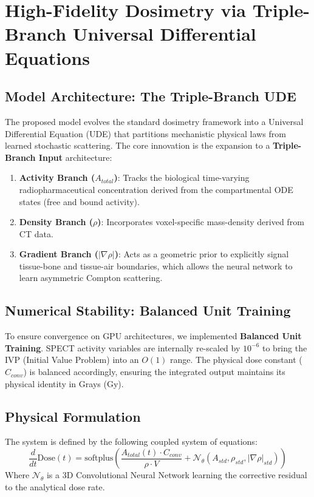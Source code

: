 \documentclass[10pt,letterpaper]{article}
\begin{document}
\begin{table}[H]
\begin{tabular}{|l|l|c|c|}
\end{tabular}
\end{table}


\section{High-Fidelity Dosimetry via Triple-Branch Universal Differential Equations}

\subsection{Model Architecture: The Triple-Branch UDE}
The proposed model evolves the standard dosimetry framework into a Universal Differential Equation (UDE) that partitions mechanistic physical laws from learned stochastic scattering. The core innovation is the expansion to a \textbf{Triple-Branch Input} architecture:
\begin{enumerate}
    \item \textbf{Activity Branch ($A_{total}$)}: Tracks the biological time-varying radiopharmaceutical concentration derived from the compartmental ODE states (free and bound activity).
    \item \textbf{Density Branch ($\rho$)}: Incorporates voxel-specific mass-density derived from CT data.
    \item \textbf{Gradient Branch ($|\nabla \rho|$)}: Acts as a geometric prior to explicitly signal tissue-bone and tissue-air boundaries, which allows the neural network to learn asymmetric Compton scattering.
\end{enumerate}

\subsection{Numerical Stability: Balanced Unit Training}
To ensure convergence on GPU architectures, we implemented \textbf{Balanced Unit Training}. SPECT activity variables are internally re-scaled by $10^{-6}$ to bring the IVP (Initial Value Problem) into an $O(1)$ range. The physical dose constant ($C_{conv}$) is balanced accordingly, ensuring the integrated output maintains its physical identity in Grays (Gy).

\subsection{Physical Formulation}
The system is defined by the following coupled system of equations:
\begin{equation}
    \frac{d}{dt} \text{Dose}(t) = \text{softplus} \left( \frac{A_{total}(t) \cdot C_{conv}}{\rho \cdot V} + \mathcal{N}_\theta(A_{std}, \rho_{std}, |\nabla \rho|_{std}) \right)
\end{equation}
Where $\mathcal{N}_\theta$ is a 3D Convolutional Neural Network learning the corrective residual to the analytical dose rate. 
\end{document}
